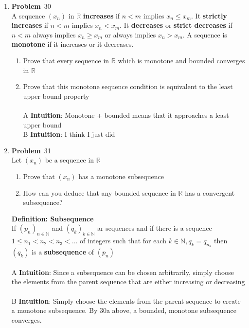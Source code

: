 \documentclass[12pt]{amsart}
\newcommand{\benu}{\begin{enumerate}}
\newcommand{\eenu}{\end{enumerate}}
\theoremstyle{definition}
\newcommand{\mbR}{\mathbb{R}}
\newcommand{\mbN}{\mathbb{N}}
\newcommand{\itep}{\item {\bfseries Problem}\ }
\begin{document}
\begin{enumerate}[series=p]
\itep 30\\
A sequence $(x_n)$ in $\mbR$ \textbf{increases} if $n< m$ implies $x_n \leq x_m$.  It \textbf{strictly increases} if $n < m$ implies $x_n < x_m$.  It \textbf{decreases} or \textbf{strict decreases} if $n < m$ always implies $x_n \geq x_m$ or always implies $x_n > x_m$.  A sequence is \textbf{monotone} if it increases or it decreases.
\benu
\item Prove that every sequence in $\mbR$ which is monotone and bounded converges in $\mbR$
\item Prove that this monotone sequence condition is equivalent to the least upper bound property
\\\\
A \textbf{Intuition}: Monotone + bounded means that it approaches a least upper bound
\\
B \textbf{Intuition}: I think I just did
\eenu

\newpage

\itep 31\\
Let $(x_n)$ be a sequence in $\mbR$
\benu
\item Prove that $(x_n)$ has a monotone subsequence
\item How can you deduce that any bounded sequence in $\mbR$ has a convergent subsequence?
\eenu
\textbf{Definition: Subsequence}\\
If $(p_n)_{n \in \mbN}$ and $(q_k)_{k \in \mbN}$ ar sequences and if there is a sequence  $1 \leq n_1 < n_2 < n_3 < \dots$ of integers such that for each $k \in \mbN, q_k = q_{n_k}$ then $(q_k)$ is a \textbf{subsequence} of $(p_n)$
\\
\\
A \textbf{Intuition}: Since a subsequence can be chosen arbitrarily, simply choose the elements from the parent sequence that are either increasing or decreasing
\\
\\
B \textbf{Intuition}: Simply choose the elements from the parent sequence to create a monotone subsequence.  By 30a above, a bounded, monotone subsequence converges.
\end{enumerate}
\end{document}

